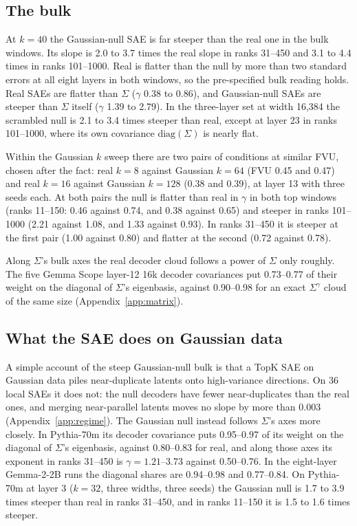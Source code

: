 \documentclass{article}
\newcommand{\Sig}{\Sigma}
\begin{document}
\subsection{The bulk}
\label{app:gbulk}

At $k=40$ the Gaussian-null SAE is far steeper than the real one in the bulk windows. Its slope is 2.0 to 3.7 times the real slope in ranks 31--450 and 3.1 to 4.4 times in ranks 101--1000. Real is flatter than the null by more than two standard errors at all eight layers in both windows, so the pre-specified bulk reading holds. Real SAEs are flatter than $\Sig$ ($\gamma$ 0.38 to 0.86), and Gaussian-null SAEs are steeper than $\Sig$ itself ($\gamma$ 1.39 to 2.79). In the three-layer set at width 16,384 the scrambled null is 2.1 to 3.4 times steeper than real, except at layer 23 in ranks 101--1000, where its own covariance $\mathrm{diag}(\Sig)$ is nearly flat.

Within the Gaussian $k$ sweep there are two pairs of conditions at similar FVU, chosen after the fact: real $k=8$ against Gaussian $k=64$ (FVU 0.45 and 0.47) and real $k=16$ against Gaussian $k=128$ (0.38 and 0.39), at layer 13 with three seeds each. At both pairs the null is flatter than real in $\gamma$ in both top windows (ranks 11--150: 0.46 against 0.74, and 0.38 against 0.65) and steeper in ranks 101--1000 (2.21 against 1.08, and 1.33 against 0.93). In ranks 31--450 it is steeper at the first pair (1.00 against 0.80) and flatter at the second (0.72 against 0.78).

Along $\Sig$'s bulk axes the real decoder cloud follows a power of $\Sig$ only roughly. The five Gemma Scope layer-12 16k decoder covariances put 0.73--0.77 of their weight on the diagonal of $\Sig$'s eigenbasis, against 0.90--0.98 for an exact $\Sig^{\gamma}$ cloud of the same size (Appendix~\ref{app:matrix}).

\subsection{What the SAE does on Gaussian data}
\label{app:gregime}

A simple account of the steep Gaussian-null bulk is that a TopK SAE on Gaussian data piles near-duplicate latents onto high-variance directions. On 36 local SAEs it does not: the null decoders have fewer near-duplicates than the real ones, and merging near-parallel latents moves no slope by more than 0.003 (Appendix~\ref{app:regime}). The Gaussian null instead follows $\Sig$'s axes more closely. In Pythia-70m its decoder covariance puts 0.95--0.97 of its weight on the diagonal of $\Sig$'s eigenbasis, against 0.80--0.83 for real, and along those axes its exponent in ranks 31--450 is $\gamma=1.21$--3.73 against 0.50--0.76. In the eight-layer Gemma-2-2B runs the diagonal shares are 0.94--0.98 and 0.77--0.84. On Pythia-70m at layer 3 ($k=32$, three widths, three seeds) the Gaussian null is 1.7 to 3.9 times steeper than real in ranks 31--450, and in ranks 11--150 it is 1.5 to 1.6 times steeper.
\end{document}
